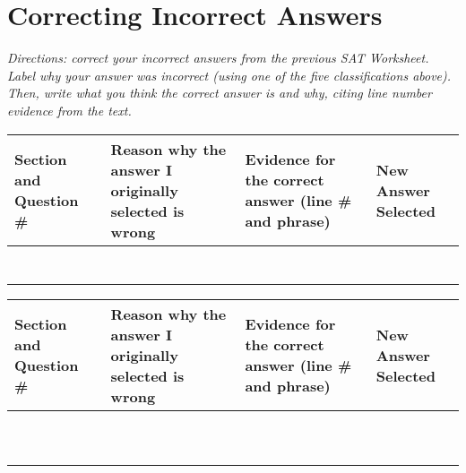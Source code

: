 \section{Correcting Incorrect Answers}

\textit{Directions: correct your incorrect answers from the previous SAT Worksheet. Label why your answer
was incorrect (using one of the five classifications above). Then, write what you think the correct
answer is and why, citing line number evidence from the text.}

\begin{tabularx}{\textwidth}{|X|p{2in}|p{2in}|X|}\hline
Section and Question \# & Reason why the answer I originally selected is wrong & Evidence for the correct answer (line \# and phrase) & New Answer Selected\\\hline
& & &\\[5ex]\hline
& & &\\[5ex]\hline
& & &\\[5ex]\hline
& & &\\[5ex]\hline
& & &\\[5ex]\hline
& & &\\[5ex]\hline
& & &\\[5ex]\hline
\end{tabularx}

\newpage
\begin{tabularx}{\textwidth}{|X|p{2in}|p{2in}|X|}\hline
Section and Question \# & Reason why the answer I originally selected is wrong & Evidence for the correct answer (line \# and phrase) & New Answer Selected\\\hline
& & &\\[5ex]\hline
& & &\\[5ex]\hline
& & &\\[5ex]\hline
& & &\\[5ex]\hline
& & &\\[5ex]\hline
& & &\\[5ex]\hline
& & &\\[5ex]\hline
& & &\\[5ex]\hline
& & &\\[5ex]\hline
& & &\\[5ex]\hline
\end{tabularx}